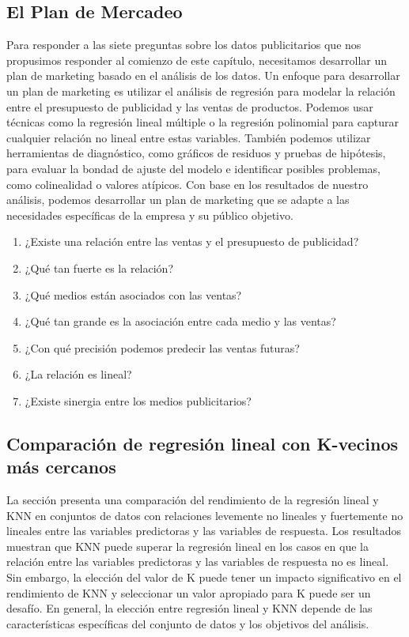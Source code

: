 \documentclass[
  letterpaper,
  DIV=11,
  numbers=noendperiod]{scrartcl}
\providecommand{\tightlist}{%
  \setlength{\itemsep}{0pt}\setlength{\parskip}{0pt}}\usepackage{longtable,booktabs,array}
\begin{document}
\hypertarget{el-plan-de-mercadeo}{%
\subsection{El Plan de Mercadeo}\label{el-plan-de-mercadeo}}

Para responder a las siete preguntas sobre los datos publicitarios que
nos propusimos responder al comienzo de este capítulo, necesitamos
desarrollar un plan de marketing basado en el análisis de los datos. Un
enfoque para desarrollar un plan de marketing es utilizar el análisis de
regresión para modelar la relación entre el presupuesto de publicidad y
las ventas de productos. Podemos usar técnicas como la regresión lineal
múltiple o la regresión polinomial para capturar cualquier relación no
lineal entre estas variables. También podemos utilizar herramientas de
diagnóstico, como gráficos de residuos y pruebas de hipótesis, para
evaluar la bondad de ajuste del modelo e identificar posibles problemas,
como colinealidad o valores atípicos. Con base en los resultados de
nuestro análisis, podemos desarrollar un plan de marketing que se adapte
a las necesidades específicas de la empresa y su público objetivo.

\begin{enumerate}
\def\labelenumi{\arabic{enumi}.}
\tightlist
\item
  ¿Existe una relación entre las ventas y el presupuesto de publicidad?
\item
  ¿Qué tan fuerte es la relación?
\item
  ¿Qué medios están asociados con las ventas?
\item
  ¿Qué tan grande es la asociación entre cada medio y las ventas?
\item
  ¿Con qué precisión podemos predecir las ventas futuras?
\item
  ¿La relación es lineal?
\item
  ¿Existe sinergia entre los medios publicitarios?
\end{enumerate}

\hypertarget{comparaciuxf3n-de-regresiuxf3n-lineal-con-k-vecinos-muxe1s-cercanos}{%
\subsection{Comparación de regresión lineal con K-vecinos más
cercanos}\label{comparaciuxf3n-de-regresiuxf3n-lineal-con-k-vecinos-muxe1s-cercanos}}

La sección presenta una comparación del rendimiento de la regresión
lineal y KNN en conjuntos de datos con relaciones levemente no lineales
y fuertemente no lineales entre las variables predictoras y las
variables de respuesta. Los resultados muestran que KNN puede superar la
regresión lineal en los casos en que la relación entre las variables
predictoras y las variables de respuesta no es lineal. Sin embargo, la
elección del valor de K puede tener un impacto significativo en el
rendimiento de KNN y seleccionar un valor apropiado para K puede ser un
desafío. En general, la elección entre regresión lineal y KNN depende de
las características específicas del conjunto de datos y los objetivos
del análisis.
\end{document}
